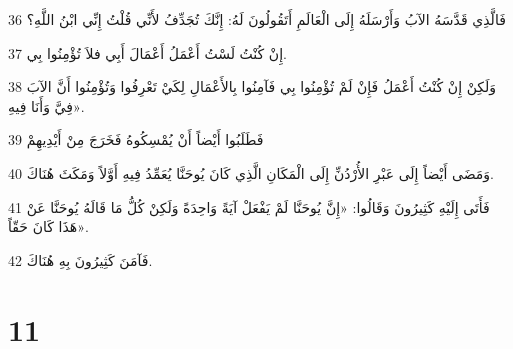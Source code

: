 \par 36 فَالَّذِي قَدَّسَهُ الآبُ وَأَرْسَلَهُ إِلَى الْعَالَمِ أَتَقُولُونَ لَهُ: إِنَّكَ تُجَدِّفُ لأَنِّي قُلْتُ إِنِّي ابْنُ اللَّهِ؟
\par 37 إِنْ كُنْتُ لَسْتُ أَعْمَلُ أَعْمَالَ أَبِي فلاَ تُؤْمِنُوا بِي.
\par 38 وَلَكِنْ إِنْ كُنْتُ أَعْمَلُ فَإِنْ لَمْ تُؤْمِنُوا بِي فَآمِنُوا بِالأَعْمَالِ لِكَيْ تَعْرِفُوا وَتُؤْمِنُوا أَنَّ الآبَ فِيَّ وَأَنَا فِيهِ».
\par 39 فَطَلَبُوا أَيْضاً أَنْ يُمْسِكُوهُ فَخَرَجَ مِنْ أَيْدِيهِمْ
\par 40 وَمَضَى أَيْضاً إِلَى عَبْرِ الأُرْدُنِّ إِلَى الْمَكَانِ الَّذِي كَانَ يُوحَنَّا يُعَمِّدُ فِيهِ أَوَّلاً وَمَكَثَ هُنَاكَ.
\par 41 فَأَتَى إِلَيْهِ كَثِيرُونَ وَقَالُوا: «إِنَّ يُوحَنَّا لَمْ يَفْعَلْ آيَةً وَاحِدَةً وَلَكِنْ كُلُّ مَا قَالَهُ يُوحَنَّا عَنْ هَذَا كَانَ حَقّاً».
\par 42 فَآمَنَ كَثِيرُونَ بِهِ هُنَاكَ.

\chapter{11}

